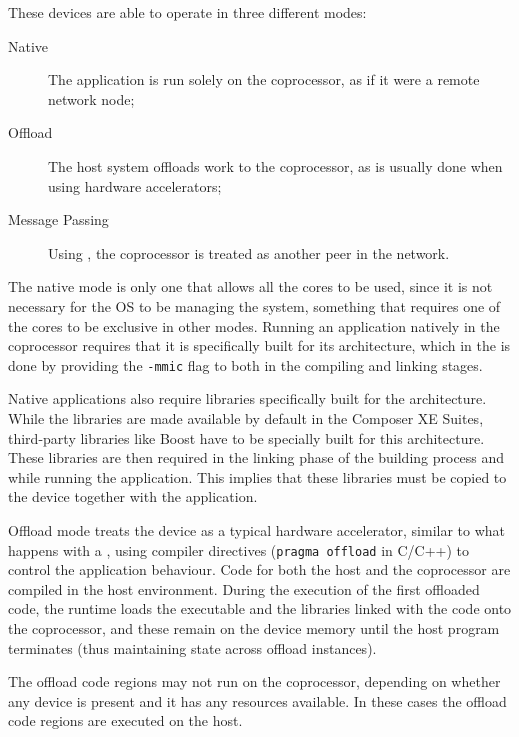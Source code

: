 \documentclass[../thesis]{subfiles}
\begin{document}
	These devices are able to operate in three different modes:
		\begin{description}
			\item [Native] The application is run solely on the coprocessor, as if it were a remote network node;
			\item [Offload] The host system offloads work to the coprocessor, as is usually done when using hardware accelerators;
			\item [Message Passing] Using \mpi, the coprocessor is treated as another peer in the network.
		\end{description}

	The native mode is only one that allows all the cores to be used, since it is not necessary for the OS to be managing the system, something that requires one of the cores to be exclusive in other modes. Running an application natively in the coprocessor requires that it is specifically built for its architecture, which in the \icc is done by providing the \texttt{-mmic} flag to both in the compiling and linking stages.

	Native applications also require libraries specifically built for the \intel\mic architecture. While the \intel libraries are made available by default in the \intel Composer XE Suites, third-party libraries like Boost have to be specially built for this architecture. These libraries are then required in the linking phase of the building process and while running the application. This implies that these libraries must be copied to the device together with the application. 


	Offload mode treats the device as a typical hardware accelerator, similar to what happens with a \gpu, using compiler directives (\texttt{pragma offload} in C/C++) to control the application behaviour. Code for both the host and the coprocessor are compiled in the host environment. During the execution of the first offloaded code, the runtime loads the executable and the libraries linked with the code onto the coprocessor, and these remain on the device memory until the host program terminates (thus maintaining state across offload instances).

	The offload code regions may not run on the coprocessor, depending on whether any device is present and it has any resources available. In these cases the offload code regions are executed on the host.
\end{document}
